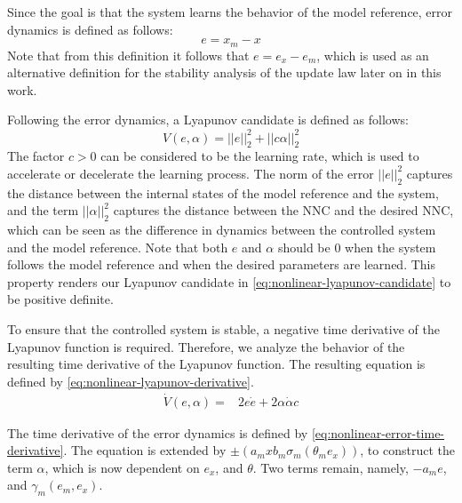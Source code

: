 Since the goal is that the system learns the behavior of the model reference, error dynamics is defined as follows:
\begin{equation}
 e=x_m-x
 \label{eq:error-dynamics-nonlinear}
\end{equation}
Note that from this definition it follows that $e=e_x-e_m$, which is used as an alternative definition for the stability analysis of the update law later on in this work.

Following the error dynamics, a Lyapunov candidate is defined as follows:
\begin{equation}
 V(e, \alpha) =||e||_2^2 + ||c \alpha||_2^2
 \label{eq:nonlinear-lyapunov-candidate}
\end{equation}
The factor $c>0$ can be considered to be the learning rate, which is used to accelerate or decelerate the learning process. The norm of the error $||e||_2^2$ captures the distance between the internal states of the model reference and the system, and the term $||\alpha||_2^2$ captures the distance between the NNC and the desired NNC, which can be seen as the difference in dynamics between the controlled system and the model reference. Note that both $e$ and $\alpha$ should be $0$ when the system follows the model reference and when the desired parameters are learned. This property renders our Lyapunov candidate in \eqref{eq:nonlinear-lyapunov-candidate} to be positive definite.

To ensure that the controlled system is stable, a negative time derivative of the Lyapunov function is required. Therefore, we analyze the behavior of the resulting time derivative of the Lyapunov function. The resulting equation is defined by \eqref{eq:nonlinear-lyapunov-derivative}.
\begin{equation}
 \begin{aligned}
 \dot V(e, \alpha) = & 2e\dot e + 2\alpha \dot \alpha c
 \end{aligned}
 \label{eq:nonlinear-lyapunov-derivative}
\end{equation}

The time derivative of the error dynamics is defined by \eqref{eq:nonlinear-error-time-derivative}. The equation is extended by $\pm (a_mx b_m \sigma_m(\theta_m e_x))$, to construct the term $\alpha$, which is now dependent on $e_x$, and $\theta$. Two terms remain, namely, $-a_me$, and $\gamma_m(e_m, e_x)$.

